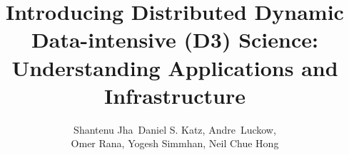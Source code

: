 




\title{Introducing Distributed Dynamic Data-intensive (D3) Science:
  Understanding Applications and Infrastructure}



\author{Shantenu Jha\corrauth\, Daniel S. Katz,
  Andre~Luckow, \\ Omer Rana, Yogesh Simmhan, Neil Chue
  Hong}




\address{Rutgers University\break
{}University of Chicago \& Argonne National Laboratory\break
{}Cardiff University\break
{}Indian Institute of Science\break
{}University of Edinburgh\break
}




